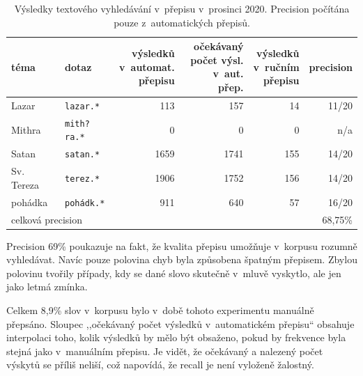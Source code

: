 \begin{table}[htpb]
\begin{center}
\begin{tabular}{|l|l|r|r|r|r|}
\hline
téma &
dotaz &
\makecell{výsledků\\ v~automat.\\ přepisu} &
\makecell{očekávaný\\ počet výsl.\\ v~aut. přep.} &
\makecell{výsledků\\ v~ručním\\ přepisu} &
precision \\
\hline
Lazar & \texttt{lazar.*} & 113 & 157 & 14 & 11/20   \\
Mithra & \texttt{mith?ra.*} & 0 & 0 & 0 & n/a   \\
Satan & \texttt{satan.*} & 1659 & 1741 & 155 & 14/20   \\
Sv. Tereza & \texttt{terez.*} & 1906 & 1752 & 156 & 14/20   \\
pohádka & \texttt{pohádk.*} & 911 & 640 & 57 & 16/20   \\
\hline
\multicolumn{5}{|l|}{celková precision} & 68,75\%\\
\hline
\end{tabular}
\caption{Výsledky textového vyhledávání v~přepisu v~prosinci 2020. Precision počítána pouze
z~automatických přepisů.}\label{tab:topicsearch}
\end{center}
\end{table}


Precision 69\% poukazuje na fakt, že
kvalita přepisu umožňuje v~korpusu rozumně vyhledávat.
Navíc pouze polovina chyb byla způsobena špatným přepisem. Zbylou polovinu
tvořily případy, kdy se dané slovo skutečně v~mluvě vyskytlo, ale jen jako letmá
zmínka.

Celkem 8,9\% slov v~korpusu bylo v~době tohoto experimentu manuálně přepsáno. Sloupec ,,očekávaný počet
výsledků v~automatickém přepisu`` obsahuje interpolaci toho, kolik výsledků by
mělo být obsaženo, pokud by frekvence byla stejná jako v~manuálním přepisu.
Je vidět, že očekávaný a nalezený počet výskytů se příliš neliší, což napovídá,
že recall je není vyloženě žalostný.

